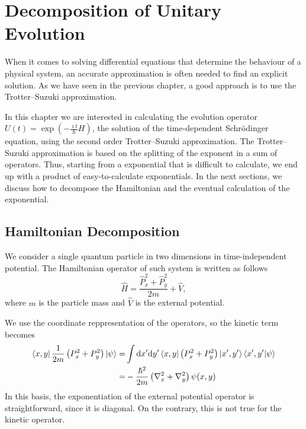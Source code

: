 \chapter{Decomposition of Unitary Evolution}
When it comes to solving differential equations that determine the behaviour of a physical system, an accurate approximation is often needed to find an explicit solution. As we have seen in the previous chapter, a good approach is to use the Trotter--Suzuki approximation. 

In this chapter we are interested in calculating the evolution operator $U(t) = \exp \left( - \frac{\imath t}{\hbar} H \right)$, the solution of the time-dependent Schr\"odinger equation, using the second order Trotter--Suzuki approximation. The Trotter--Suzuki approximation is based on the splitting of the exponent in a sum of operators. Thus, starting from a exponential that is difficult to calculate, we end up with a product of easy-to-calculate exponentials. In the next sections, we discuss how to decompose the Hamiltonian and the eventual calculation of the exponential.

\section{Hamiltonian Decomposition}
We consider a single quantum particle in two dimensions in time-independent potential. The Hamiltonian operator of such system is written as follows
\begin{equation} \label{eq:hamiltonian-implementation}
\hat{H} = \frac{\hat{P}_x^2 + \hat{P}_y^2}{2m} + \hat{V},
\end{equation}
where $m$ is the particle mass and $\hat{V}$ is the external potential.

We use the coordinate reppresentation of the operators, so the kinetic term becomes
\begin{subequations}
\begin{align}
\bra{x,y} \frac{1}{2m} \left( P_x^2 + P_y^2 \right) \ket{\psi} = & \int \mathrm{d}x' \mathrm{d}y' \bra{x,y} \left( P_x^2 + P_y^2 \right) \ket{x',y'} \braket{x',y'|\psi} \label{eq:tot-momentum1} \\
= & - \frac{\hbar^2}{2m} \left( \nabla_x^2 + \nabla_y^2 \right) \psi(x,y) \label{eq:tot_momentum}
\end{align}
\end{subequations}
In this basis, the exponentiation of the external potential operator is straightforward, since it is diagonal. On the contrary, this is not true for the kinetic operator.

